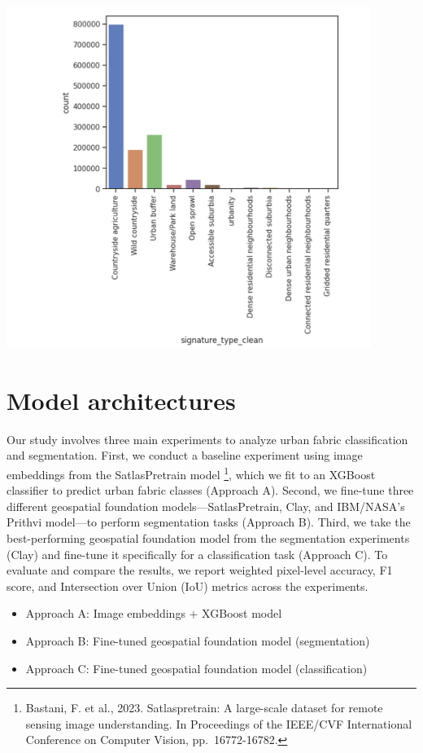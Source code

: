 \documentclass[
  letterpaper,
  DIV=11,
  numbers=noendperiod]{scrartcl}
\providecommand{\tightlist}{%
  \setlength{\itemsep}{0pt}\setlength{\parskip}{0pt}}\usepackage{longtable,booktabs,array}
\begin{document}
\begin{center}
\includegraphics[width=\textwidth,height=4.375in]{../figures/algo_design/unbalanced.png}
\end{center}

\section{Model architectures}\label{model-architectures}

Our study involves three main experiments to analyze urban fabric
classification and segmentation. First, we conduct a baseline experiment
using image embeddings from the SatlasPretrain model \footnote{Bastani,
  F. et al., 2023. Satlaspretrain: A large-scale dataset for remote
  sensing image understanding. In Proceedings of the IEEE/CVF
  International Conference on Computer Vision, pp.~16772-16782.}, which
we fit to an XGBoost classifier to predict urban fabric classes
(Approach A). Second, we fine-tune three different geospatial foundation
models---SatlasPretrain, Clay, and IBM/NASA's Prithvi model---to perform
segmentation tasks (Approach B). Third, we take the best-performing
geospatial foundation model from the segmentation experiments (Clay) and
fine-tune it specifically for a classification task (Approach C). To
evaluate and compare the results, we report weighted pixel-level
accuracy, F1 score, and Intersection over Union (IoU) metrics across the
experiments.

\begin{itemize}
\tightlist
\item
  Approach A: Image embeddings + XGBoost model
\item
  Approach B: Fine-tuned geospatial foundation model (segmentation)
\item
  Approach C: Fine-tuned geospatial foundation model (classification)
\end{itemize}
\end{document}
